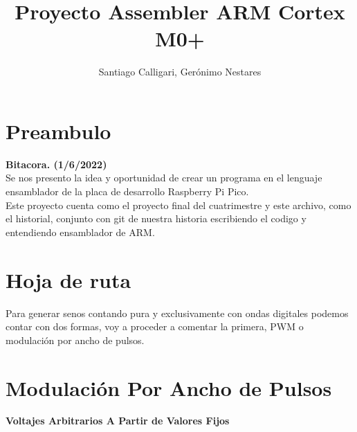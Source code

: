 \documentclass[]{article}
\title{Proyecto Assembler ARM Cortex M0+}
\author{Santiago Calligari, Gerónimo Nestares}
\begin{document}
\maketitle
\section*{Preambulo}
\textbf{\scriptsize{Bitacora. (1/6/2022)}}\\
Se nos presento la idea y oportunidad de crear un programa en el lenguaje ensamblador de la placa de desarrollo Raspberry Pi Pico. \\
Este proyecto cuenta como el proyecto final del cuatrimestre y este archivo, como el historial, conjunto con git de nuestra historia escribiendo el codigo y entendiendo ensamblador de ARM.	
\section*{Hoja de ruta}
Para generar senos contando pura y exclusivamente con ondas digitales podemos contar con dos formas, voy a proceder a comentar la primera, PWM o modulación por ancho de pulsos.\\
\section*{Modulación Por Ancho de Pulsos}
\textbf{\scriptsize{Voltajes Arbitrarios A Partir de Valores Fijos}}

\end{document}
